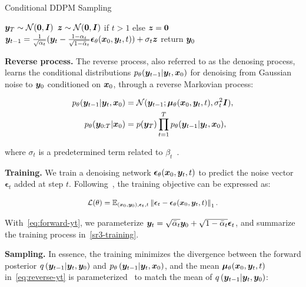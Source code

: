 \begin{algorithm}[t]
\small
\caption{Conditional DDPM Sampling}
\begin{algorithmic}[1]
    \STATE ${{\bm{y}}}_T\sim{\mathcal{N}}({\bm{0}}, {\bm{I}})$
\STATE ${\bm{z}}\sim{\mathcal{N}}({\bm{0}},{\bm{I}})$ if $t>1$ else ${\bm{z}}={\bm{0}}$
\STATE ${{\bm{y}}}_{t-1}=\frac{1}{\sqrt{\alpha_t}}({{\bm{y}}}_t-\frac{1-\alpha_t}{\sqrt{1-\bar{\alpha}_t}}\bm{{\mathbf{\epsilon}}}_{\mathbf{\theta}}({\bm{x}}_0, {{\bm{y}}}_t, t))+\sigma_t{\bm{z}}$\label{line:update-yt-sampling}
\ENDFOR
\STATE return ${{\bm{y}}}_0$
\end{algorithmic}
\label{sr3-sampling}
\end{algorithm}


\textbf{Reverse process.} The reverse process, also referred to as the denosing process,  learns the conditional distributions $ p_\theta({\bm{y}}_{t-1} | {\bm{y}}_t, {\bm{x}}_0) $ for denoising from Gaussian noise to  ${\bm{y}}_0$ conditioned on ${\bm{x}}_0$, through a reverse Markovian process:

\vspace{-.2in}
\begin{align}
\small
    p_{\mathbf{\theta}}({\bm{y}}_{t-1}|{\bm{y}}_{t}, {\bm{x}}_0) &= {\mathcal{N}}({\bm{y}}_{t-1}; {\bm{\mu}}_{\mathbf{\theta}}({\bm{x}}_0,{\bm{y}}_t,t), \sigma_t^2{\bm{I}}),\label{eq:reverse-yt}\\
p_{\mathbf{\theta}}({\bm{y}}_{0:T}| {\bm{x}}_0)&=p({\bm{y}}_T)\prod_{t=1}^Tp_{\mathbf{\theta}}({\bm{y}}_{t-1}|{\bm{y}}_{t},{\bm{x}}_0),
\end{align}
\vspace{-.2in}

\noindent
where $\sigma_t$ is a predetermined term related to $\beta_t$~\cite{ho2020denoising}.


\textbf{Training.} We train a denoising network $\bm\epsilon_\theta(\bm x_0,{\bm{y}}_t, t)$ to predict the noise vector $\bm\epsilon_t$ added at step $t$. Following~\cite{ho2020denoising, saharia2022image}, the training objective can be expressed as:

\vspace{-.2in}
\begin{align}
\small
    {\mathcal{L}}({\mathbf{\theta}}) = \mathbb{E}_{({\bm{x}}_0,{\bm{y}}_0), \bm{{\mathbf{\epsilon}}}_t, t}\left\|\bm{{\mathbf{\epsilon}}}_t - \bm{{\mathbf{\epsilon}}}_{\mathbf{\theta}}({\bm{x}}_0,{\bm{y}}_t, t)\right\|_1.
    \label{eq:dm-objective}
\end{align}
\vspace{-.2in}

\noindent
With~\cref{eq:forward-yt}, we parameterize ${\bm{y}}_t=\sqrt{\bar{\alpha}_t}{\bm{y}}_0 + \sqrt{1-\bar{\alpha}_t}\bm{{\mathbf{\epsilon}}}_t$, and summarize the training process in~\cref{sr3-training}.

\textbf{Sampling.} In essence, the training minimizes the divergence between the forward posterior $q\left({\bm{y}}_{t-1} | {\bm{y}}_t, {\bm{y}}_0\right)$ and $p_\theta\left({\bm{y}}_{t-1} | {\bm{y}}_t,{\bm{x}}_0\right)$, and the mean ${\bm{\mu}}_{\mathbf{\theta}}({\bm{x}}_0, {\bm{y}}_t, t)$ in~\cref{eq:reverse-yt} is parameterized~\cite{saharia2022image} to match the mean of $q\left({\bm{y}}_{t-1} | {\bm{y}}_t, {\bm{y}}_0\right)$:

